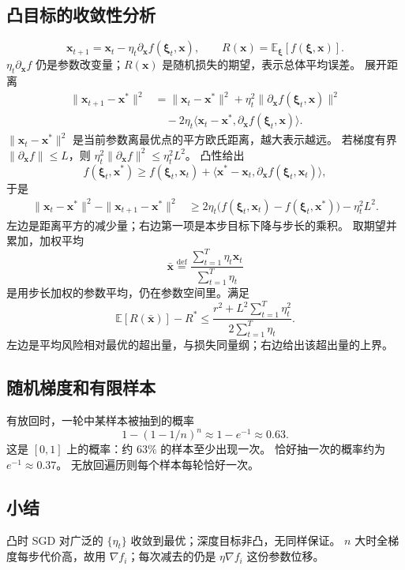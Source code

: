 \subsection{凸目标的收敛性分析}

\[
\bm{x}_{t+1}
=
\bm{x}_t-\eta_t\partial_{\bm{x}}f(\bm{\xi}_t,\bm{x}),
\qquad
R(\bm{x})=\mathbb{E}_{\bm{\xi}}[f(\bm{\xi},\bm{x})].
\]
$\eta_t\partial_{\bm{x}}f$ 仍是参数改变量；$R(\bm{x})$ 是随机损失的期望，表示总体平均误差。
展开距离
\begin{align*}
\|\bm{x}_{t+1}-\bm{x}^{\ast}\|^2
&=
\|\bm{x}_t-\bm{x}^{\ast}\|^2
+\eta_t^2\|\partial_{\bm{x}}f(\bm{\xi}_t,\bm{x})\|^2
\\
&\quad
-2\eta_t\langle\bm{x}_t-\bm{x}^{\ast},\partial_{\bm{x}}f(\bm{\xi}_t,\bm{x})\rangle.
\end{align*}
$\|\bm{x}_t-\bm{x}^{\ast}\|^2$ 是当前参数离最优点的平方欧氏距离，越大表示越远。
若梯度有界 $\|\partial_{\bm{x}}f\|\leq L$，则
$\eta_t^2\|\partial_{\bm{x}}f\|^2\leq\eta_t^2 L^2$。
凸性给出
\[
f(\bm{\xi}_t,\bm{x}^{\ast})
\geq
f(\bm{\xi}_t,\bm{x}_t)
+\langle\bm{x}^{\ast}-\bm{x}_t,\partial_{\bm{x}}f(\bm{\xi}_t,\bm{x}_t)\rangle,
\]
于是
\begin{align*}
\|\bm{x}_t-\bm{x}^{\ast}\|^2
-\|\bm{x}_{t+1}-\bm{x}^{\ast}\|^2
&\geq
2\eta_t\bigl(f(\bm{\xi}_t,\bm{x}_t)-f(\bm{\xi}_t,\bm{x}^{\ast})\bigr)
-\eta_t^2 L^2.
\end{align*}
左边是距离平方的减少量；右边第一项是本步目标下降与步长的乘积。
取期望并累加，加权平均
\[
\bar{\bm{x}}
\stackrel{\mathrm{def}}{=}
\frac{\sum_{t=1}^{T}\eta_t\bm{x}_t}{\sum_{t=1}^{T}\eta_t}
\]
是用步长加权的参数平均，仍在参数空间里。满足
\[
\mathbb{E}[R(\bar{\bm{x}})]-R^{\ast}
\leq
\frac{r^2+L^2\sum_{t=1}^{T}\eta_t^2}{2\sum_{t=1}^{T}\eta_t}.
\]
左边是平均风险相对最优的超出量，与损失同量纲；右边给出该超出量的上界。

\subsection{随机梯度和有限样本}

有放回时，一轮中某样本被抽到的概率
\[
1-(1-1/n)^n\approx 1-e^{-1}\approx 0.63.
\]
这是 $[0,1]$ 上的概率：约 $63\%$ 的样本至少出现一次。
恰好抽一次的概率约为 $e^{-1}\approx 0.37$。
无放回遍历则每个样本每轮恰好一次。

\subsection{小结}

凸时 SGD 对广泛的 $\{\eta_t\}$ 收敛到最优；深度目标非凸，无同样保证。
$n$ 大时全梯度每步代价高，故用 $\nabla f_i$；每次减去的仍是 $\eta\nabla f_i$ 这份参数位移。

